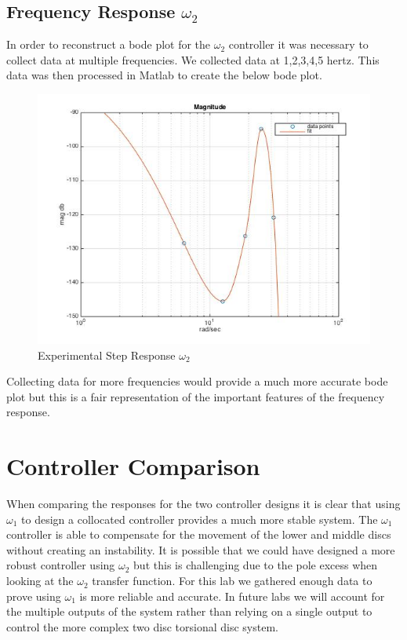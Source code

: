 \documentclass[11pt,titlepage]{article}
\begin{document}
	\subsection{Frequency Response $\omega_2$}
		In order to reconstruct a bode plot for the $\omega_2$ controller it was necessary to collect data at multiple frequencies. We collected data at 1,2,3,4,5 hertz. This data was then processed in Matlab to create the below bode plot.
		\begin{figure}[H]
			\centering
			\includegraphics[scale=0.5]{experBodew2}
			\caption{Experimental Step Response $\omega_2$}
		\end{figure}
		Collecting data for more frequencies would provide a much more accurate bode plot but this is a fair representation of the important features of the frequency response.

\section{Controller Comparison}
When comparing the responses for the two controller designs it is clear that using $\omega_1$ to design a collocated controller provides a much more stable system. The $\omega_1$ controller is able to compensate for the movement of the lower and middle discs without creating an instability. It is possible that we could have designed a more robust controller using $\omega_2$ but this is challenging due to the pole excess when looking at the $\omega_2$ transfer function. For this lab we gathered enough data to prove using $\omega_1$ is more reliable and accurate. In future labs we will account for the multiple outputs of the system rather than relying on a single output to control the more complex two disc torsional disc system. 
\end{document}
